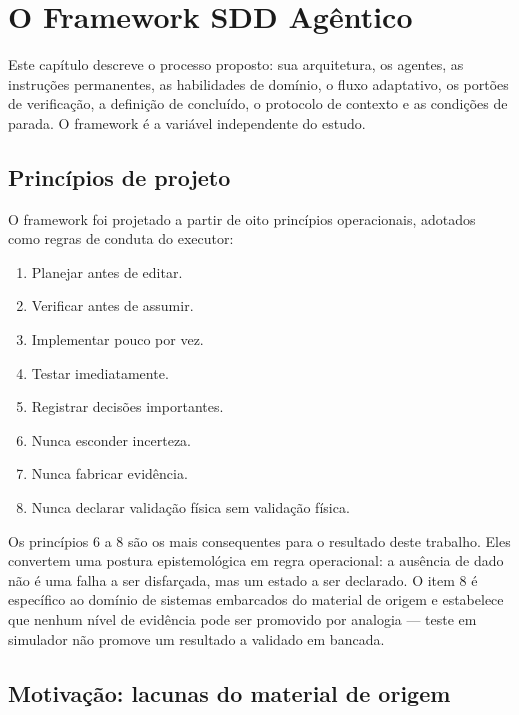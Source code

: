 
\chapter{O Framework SDD Agêntico}
\label{cap:framework}

Este capítulo descreve o processo proposto: sua arquitetura, os agentes, as
instruções permanentes, as habilidades de domínio, o fluxo adaptativo, os portões
de verificação, a definição de concluído, o protocolo de contexto e as condições
de parada. O framework é a variável independente do estudo.

\section{Princípios de projeto}
\label{sec:fw-principios}

O framework foi projetado a partir de oito princípios operacionais, adotados como
regras de conduta do executor:

\begin{enumerate}
	\item Planejar antes de editar.
	\item Verificar antes de assumir.
	\item Implementar pouco por vez.
	\item Testar imediatamente.
	\item Registrar decisões importantes.
	\item Nunca esconder incerteza.
	\item Nunca fabricar evidência.
	\item Nunca declarar validação física sem validação física.
\end{enumerate}

Os princípios 6 a 8 são os mais consequentes para o resultado deste trabalho.
Eles convertem uma postura epistemológica em regra operacional: a ausência de
dado não é uma falha a ser disfarçada, mas um estado a ser declarado. O item 8 é
específico ao domínio de sistemas embarcados do material de origem e estabelece
que nenhum nível de evidência pode ser promovido por analogia --- teste em
simulador não promove um resultado a validado em bancada.

\section{Motivação: lacunas do material de origem}
\label{sec:fw-lacunas}

